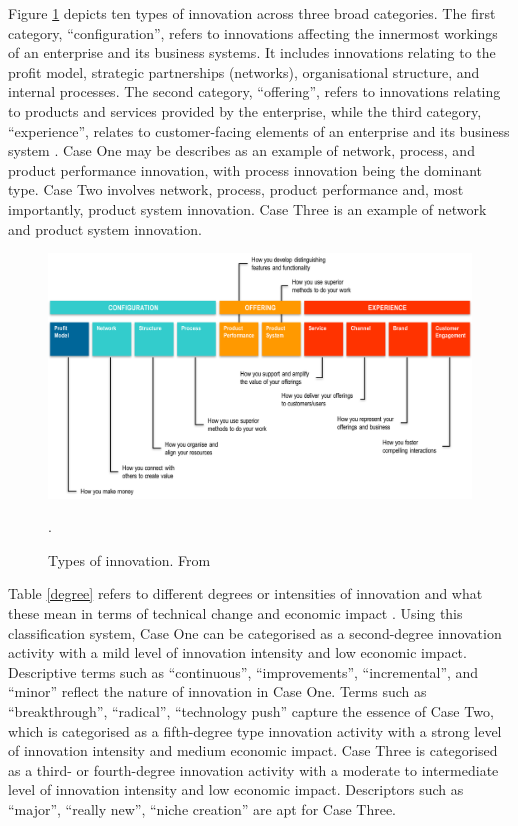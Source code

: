 Figure \ref{fig:innovation_type} depicts ten types of innovation across three broad categories. The first category, \enquote{configuration}, refers to innovations affecting the innermost workings of an enterprise and its business systems. It includes innovations relating to the profit model, strategic partnerships (networks), organisational structure, and internal processes. The second category, \enquote{offering}, refers to innovations relating to products and services provided by the enterprise, while the third category, \enquote{experience}, relates to customer-facing elements of an enterprise and its business system \citep{keeley2013ten}. Case One may be describes as an example of network, process, and product performance innovation, with process innovation being the dominant type. Case Two involves network, process, product performance and, most importantly, product system innovation. Case Three is an example of network and product system innovation. \medskip    

\begin{figure}
	\centering
	\includegraphics[width=1.0\linewidth]{Images/innovation_types.png}
	\caption{Types of innovation. From \citep{keeley2013ten}}.
	\label{fig:innovation_type}
\end{figure}

Table \ref{degree} refers to different degrees or intensities of innovation and what these mean in terms of technical change and economic impact \citep{coccia2005measuring}. Using this classification system, Case One can be categorised as a second-degree innovation activity with a mild level of innovation intensity and low economic impact. Descriptive terms such as \enquote{continuous}, \enquote{improvements}, \enquote{incremental}, and \enquote{minor} reflect the nature of innovation in Case One. Terms such as \enquote{breakthrough}, \enquote{radical}, \enquote{technology push} capture the essence of Case Two, which is categorised as a fifth-degree type innovation activity with a strong level of innovation intensity and medium economic impact. Case Three is categorised as a third- or fourth-degree innovation activity with a moderate to intermediate level of innovation intensity and low economic impact. Descriptors such as \enquote{major}, \enquote{really new}, \enquote{niche creation} are apt for Case Three.\medskip

